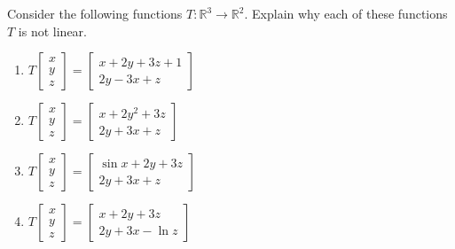 \documentclass{ximera}
\begin{document}
\begin{problem}\label{prb:10.99} Consider the following functions $T:\mathbb{R}^{3}\rightarrow \mathbb{R}^{2}.$
Explain why each of these functions $T$ is not linear.

\begin{enumerate}
\item $T\left[
\begin{array}{c}
x \\
y \\
z
\end{array}
\right] =\left[
\begin{array}{c}
x+2y+3z+1 \\
2y-3x+z
\end{array}
\right] $

\item $T\left[
\begin{array}{c}
x \\
y \\
z
\end{array}
\right] =\left[
\begin{array}{c}
x+2y^{2}+3z \\
2y+3x+z
\end{array}
\right] $

\item $T\left[
\begin{array}{c}
x \\
y \\
z
\end{array}
\right] =\left[
\begin{array}{c}
\sin x+2y+3z \\
2y+3x+z
\end{array}
\right] $

\item $T\left[
\begin{array}{c}
x \\
y \\
z
\end{array}
\right] =\left[
\begin{array}{c}
x+2y+3z \\
2y+3x-\ln z
\end{array}
\right] $
\end{enumerate}
\end{problem}


\end{document}
